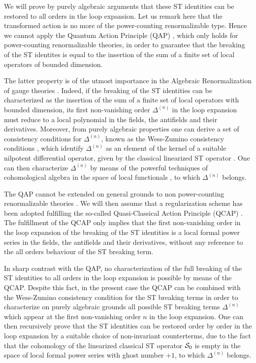 \documentclass[a4paper,11pt]{article}
\begin{document}
We will prove 
by purely algebraic arguments 
that these ST identities can be restored
to all orders in the loop expansion.
Let us remark here that the transformed action is no more of the
power-counting renormalizable type.
Hence we cannot apply the 
Quantum Action Principle (QAP) \cite{qap1,qap2,qap3,qap4,Piguet:er}, 
which only holds for power-counting
renormalizable theories, in order to guarantee that 
the breaking of the ST identites is equal to the insertion
of the sum of a finite set of local operators of bounded dimension.

The latter property is of the utmost importance in 
the Algebraic Renormalization of gauge theories 
\cite{Piguet:er}. Indeed, if the breaking of the
ST identities can be characterized as the insertion of the sum of
a finite set
of local operators with bounded dimension, its first non-vanishing
order $\Delta^{(n)}$ in the loop expansion must reduce to a local polynomial
in the fields, the antifields and their derivatives. 
Moreover, from purely algebraic properties one can derive
a set of consistency conditions for $\Delta^{(n)}$, known as 
the Wess-Zumino consistency conditions \cite{Piguet:er,Wess:yu},
which identify $\Delta^{(n)}$ as an element of the kernel
of a suitable nilpotent differential operator, given by
the classical linearized ST operator \cite{Piguet:er}.
One can then characterize $\Delta^{(n)}$ by means of the powerful
techniques of cohomological algebra 
in the space
of local functionals \cite{Piguet:er,Barnich:2000zw}, 
to which $\Delta^{(n)}$ belongs.

The QAP cannot be extended on general grounds to non power-counting
renormalizable theories \cite{ET,Stora2000}.
%
We will then assume that a regularization scheme has been adopted 
fulfilling the so-called Quasi-Classical Action Principle (QCAP) \cite{ET,Stora2000}.
The fulfillment of the QCAP only implies that the first non-vanishing
order in the loop expansion of the breaking of the ST identities
is a local formal power series in the fields, the antifields and
their derivatives, without any reference to the all orders behaviour
of the ST breaking term.

In sharp contrast with the QAP, no characterization of the full breaking
of the ST identities to all orders in the loop expansion is possible
by means of the QCAP. Despite this fact, in the present case the QCAP
can be combined with the Wess-Zumino consistency condition 
\cite{Piguet:er,Wess:yu}
for the
ST breaking terms 
in order
to characterize 
on purely algebraic 
grounds
all possible ST breaking terms $\Delta^{(n)}$ which appear
at the first non-vanishing order $n$ in the loop expansion.
One can then recursively prove that the ST identities can be restored 
order by  order in the loop expansion by a suitable choice of non-invariant 
counterterms, due to the fact that the cohomology of the 
linearized classical ST operator
${\cal S}_0$ is empty in the space of local formal power series with 
ghost number $+1$, to which $\Delta^{(n)}$ belongs.
\end{document}
